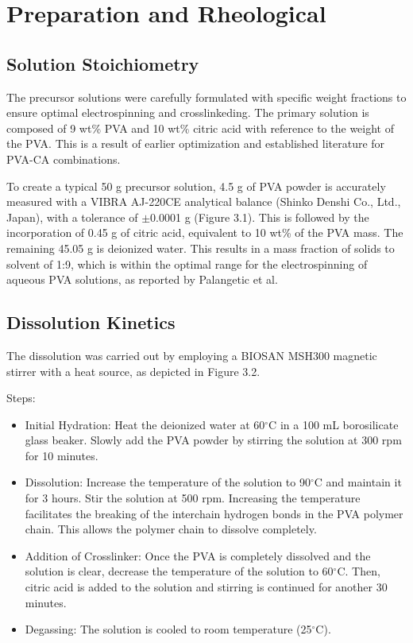 \documentclass[12pt,a4paper]{report}
\begin{document}
\section{Preparation and Rheological}
\subsection{Solution Stoichiometry}
The precursor solutions were carefully formulated with specific weight fractions to ensure optimal electrospinning and crosslinkeding. The primary solution is composed of 9 wt\% PVA and 10 wt\% citric acid with reference to the weight of the PVA. This is a result of earlier optimization and established literature for PVA-CA combinations. \cite{46,47}

To create a typical 50 g precursor solution, 4.5 g of PVA powder is accurately measured with a VIBRA AJ-220CE analytical balance (Shinko Denshi Co., Ltd., Japan), with a tolerance of \(\pm\)0.0001 g (Figure 3.1). This is followed by the incorporation of 0.45 g of citric acid, equivalent to 10 wt\% of the PVA mass. The remaining 45.05 g is deionized water. This results in a mass fraction of solids to solvent of 1:9, which is within the optimal range for the electrospinning of aqueous PVA solutions, as reported by Palangetic et al.\cite{46}



\subsection{Dissolution Kinetics}
The dissolution was carried out by employing a BIOSAN MSH300 magnetic stirrer with a heat source, as depicted in Figure 3.2.

Steps:
\begin{itemize}
    \item Initial Hydration: Heat the deionized water at 60\(^\circ\)C in a 100 mL borosilicate glass beaker. Slowly add the PVA powder by stirring the solution at 300 rpm for 10 minutes.
    \item Dissolution: Increase the temperature of the solution to 90\(^\circ\)C and maintain it for 3 hours. Stir the solution at 500 rpm. Increasing the temperature facilitates the breaking of the interchain hydrogen bonds in the PVA polymer chain. This allows the polymer chain to dissolve completely. \cite{30,32}
    \item Addition of Crosslinker: Once the PVA is completely dissolved and the solution is clear, decrease the temperature of the solution to 60\(^\circ\)C. Then, citric acid is added to the solution and stirring is continued for another 30 minutes.
    \item Degassing: The solution is cooled to room temperature (25\(^\circ\)C).\cite{39}
\end{itemize}
\end{document}
